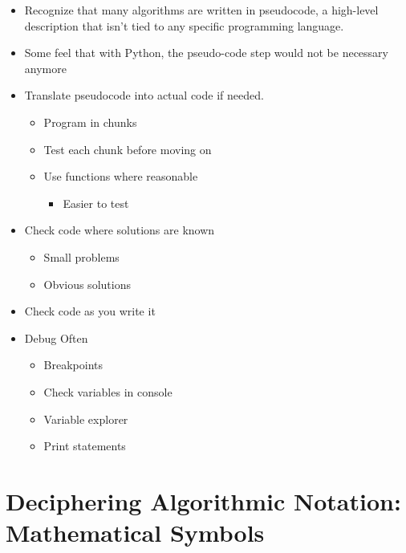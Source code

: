 \documentclass[
  letterpaper,
  DIV=11,
  numbers=noendperiod]{scrreprt}
\providecommand{\tightlist}{%
  \setlength{\itemsep}{0pt}\setlength{\parskip}{0pt}}\usepackage{longtable,booktabs,array}
\begin{document}
\begin{itemize}
\tightlist
\item
  Recognize that many algorithms are written in pseudocode, a high-level
  description that isn't tied to any specific programming language.
\item
  Some feel that with Python, the pseudo-code step would not be
  necessary anymore
\item
  Translate pseudocode into actual code if needed.

  \begin{itemize}
  \tightlist
  \item
    Program in chunks
  \item
    Test each chunk before moving on
  \item
    Use functions where reasonable

    \begin{itemize}
    \tightlist
    \item
      Easier to test
    \end{itemize}
  \end{itemize}
\item
  Check code where solutions are known

  \begin{itemize}
  \tightlist
  \item
    Small problems
  \item
    Obvious solutions
  \end{itemize}
\item
  Check code as you write it
\item
  Debug Often

  \begin{itemize}
  \tightlist
  \item
    Breakpoints
  \item
    Check variables in console
  \item
    Variable explorer
  \item
    Print statements
  \end{itemize}
\end{itemize}

\section{Deciphering Algorithmic Notation: Mathematical
Symbols}\label{deciphering-algorithmic-notation-mathematical-symbols}
\end{document}
